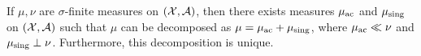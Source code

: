 \begin{theorem}[Lebesgue]
	If $\mu, \nu$ are $\sigma$-finite measures on $(\mathcal X, \mathcal A)$, then there exists measures $\mu_\mathrm{ac}$ and $\mu_\mathrm{sing}$ on $(\mathcal X, \mathcal A)$ such that $\mu$ can be decomposed as $\mu = \mu_\mathrm{ac} + \mu_{\mathrm{sing}}$, where $\mu_\mathrm{ac} \ll \nu$ and $\mu_\mathrm{sing} \perp \nu$. Furthermore, this decomposition is unique. 
\end{theorem}